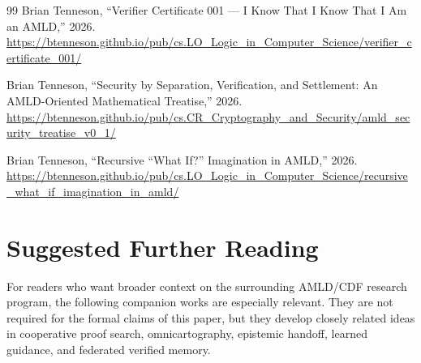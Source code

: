 \documentclass[11pt]{article}
\theoremstyle{definition}
\begin{document}
\begin{thebibliography}{99}
Brian Tenneson,
``Verifier Certificate 001 --- I Know That I Know That I Am an AMLD,'' 2026.\\
\url{https://btenneson.github.io/pub/cs.LO_Logic_in_Computer_Science/verifier_certificate_001/}

Brian Tenneson,
``Security by Separation, Verification, and Settlement: An AMLD-Oriented Mathematical Treatise,'' 2026.\\
\url{https://btenneson.github.io/pub/cs.CR_Cryptography_and_Security/amld_security_treatise_v0_1/}

Brian Tenneson,
``Recursive ``What If?'' Imagination in AMLD,'' 2026.\\
\url{https://btenneson.github.io/pub/cs.LO_Logic_in_Computer_Science/recursive_what_if_imagination_in_amld/}
\end{thebibliography}


{}
\section*{Suggested Further Reading}
For readers who want broader context on the surrounding AMLD/CDF research program, the following companion works are especially relevant.  They are not required for the formal claims of this paper, but they develop closely related ideas in cooperative proof search, omnicartography, epistemic handoff, learned guidance, and federated verified memory.
\end{document}

